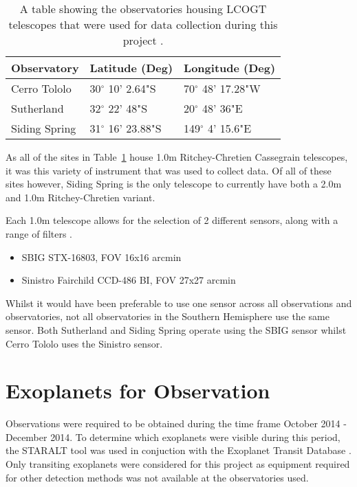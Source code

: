 \documentclass[twoside,4pt]{article}
\begin{document}
\begin{multicols}{2}
\begin{table}[H]
    \centering
    \begin{tabular}{ | l | l | l | }
    \hline \hline
    Observatory & Latitude (Deg) & Longitude (Deg)       \\ \hline \hline
    Cerro Tololo    & 30$^\circ$ 10' 2.64"S & 70$^\circ$ 48' 17.28"W  \\
    Sutherland   & 32$^\circ$ 22' 48"S & 20$^\circ$ 48' 36"E  \\
    Siding Spring  & 31$^\circ$ 16' 23.88"S & 149$^\circ$ 4' 15.6"E \\
    \hline
    \end{tabular}
    \caption{A table showing the observatories housing LCOGT telescopes that were used for data collection during this project \parencite{sites}.}
    \label{observatory}
\end{table}

As all of the sites in Table~\ref{observatory} house 1.0m Ritchey-Chretien Cassegrain telescopes, it was this variety of instrument that was used to collect data. Of all of these sites however, Siding Spring is the only telescope to currently have both a 2.0m and 1.0m Ritchey-Chretien variant. 

Each 1.0m telescope allows for the selection of 2 different sensors, along with a range of filters \parencite{1m}.

\begin{itemize}

  \item SBIG STX-16803, FOV 16x16 arcmin
  \item Sinistro Fairchild CCD-486 BI, FOV 27x27 arcmin

\end{itemize} 

Whilst it would have been preferable to use one sensor across all observations and observatories, not all observatories in the Southern Hemisphere use the same sensor. Both Sutherland and Siding Spring operate using the SBIG sensor whilst Cerro Tololo uses the Sinistro sensor.   


\section{Exoplanets for Observation}
Observations were required to be obtained during the time frame October 2014 - December 2014. To determine which exoplanets were visible during this period, the STARALT tool \parencite{staralt} was used in conjuction with the Exoplanet Transit Database \parencite{etd}. Only transiting exoplanets were considered for this project as equipment required for other detection methods was not available at the observatories used. 


\end{multicols}
\end{document}
